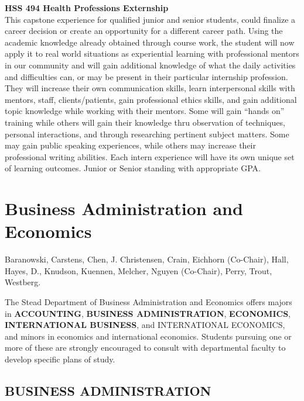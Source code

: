 \documentclass[
  letterpaper,
]{scrbook}
\begin{document}
\textbf{HSS 494 Health Professions Externship}\\
This capstone experience for qualified junior and senior students, could
finalize a career decision or create an opportunity for a different
career path. Using the academic knowledge already obtained through
course work, the student will now apply it to real world situations as
experiential learning with professional mentors in our community and
will gain additional knowledge of what the daily activities and
difficulties can, or may be present in their particular internship
profession. They will increase their own communication skills, learn
interpersonal skills with mentors, staff, clients/patients, gain
professional ethics skills, and gain additional topic knowledge while
working with their mentors. Some will gain ``hands on'' training while
others will gain their knowledge thru observation of techniques,
personal interactions, and through researching pertinent subject
matters. Some may gain public speaking experiences, while others may
increase their professional writing abilities. Each intern experience
will have its own unique set of learning outcomes. Junior or Senior
standing with appropriate GPA.

\section{Business Administration and
Economics}\label{sec-business-administration-and-economics}

Baranowski, Carstens, Chen, J. Christensen, Crain, Eichhorn (Co-Chair),
Hall, Hayes, D., Knudson, Kuennen, Melcher, Nguyen (Co-Chair), Perry,
Trout, Westberg.

The Stead Department of Business Administration and Economics offers
majors in \textbf{ACCOUNTING}, \textbf{BUSINESS ADMINISTRATION},
\textbf{ECONOMICS}, \textbf{INTERNATIONAL BUSINESS}, and INTERNATIONAL
ECONOMICS, and minors in economics and international economics. Students
pursuing one or more of these are strongly encouraged to consult with
departmental faculty to develop specific plans of study.

\subsection{BUSINESS ADMINISTRATION}\label{business-administration}
\end{document}
